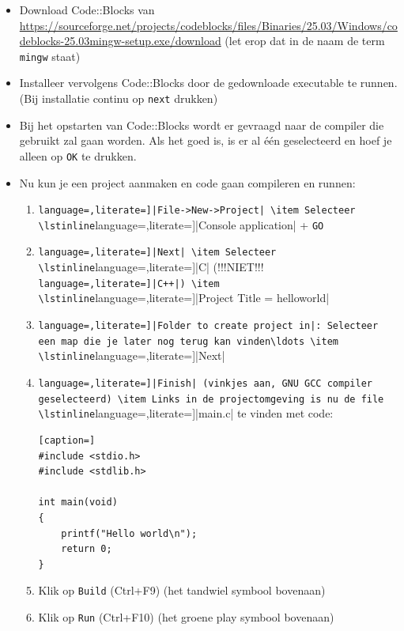\documentclass[a4paper,10pt,fleqn,twoside]{article}
\begin{document}
\begin{itemize}
\item Download Code::Blocks van \url{https://sourceforge.net/projects/codeblocks/files/Binaries/25.03/Windows/codeblocks-25.03mingw-setup.exe/download} (let erop dat in de naam de term \texttt{mingw} staat)
\item Installeer vervolgens Code::Blocks door de gedownloade executable te runnen. (Bij installatie continu op \texttt{next} drukken)
\item Bij het opstarten van Code::Blocks wordt er gevraagd naar de compiler die gebruikt zal gaan worden. Als het goed is, is er al \'e\'en geselecteerd en hoef je alleen op \texttt{OK} te drukken.
\item Nu kun je een project aanmaken en code gaan compileren en runnen:
\begin{enumerate}[label=\alph*.]
\item \lstinline[language=,literate=]|File->New->Project|
\item Selecteer \lstinline[language=,literate=]|Console application| + \lstinline|GO|
\item \lstinline[language=,literate=]|Next|
\item Selecteer \lstinline[language=,literate=]|C| (!!!NIET!!! \lstinline[language=,literate=]|C++|)
\item \lstinline[language=,literate=]|Project Title = helloworld|
\item \lstinline[language=,literate=]|Folder to create project in|: Selecteer een map die je later nog terug kan vinden\ldots
\item \lstinline[language=,literate=]|Next|
\item \lstinline[language=,literate=]|Finish| (vinkjes aan, GNU GCC compiler geselecteerd)
\item Links in de projectomgeving is nu de file \lstinline[language=,literate=]|main.c| te vinden met code:

\begin{lstlisting}[caption=]
#include <stdio.h>
#include <stdlib.h>

int main(void)
{
    printf("Hello world\n");
    return 0;
}
\end{lstlisting}
\item Klik op \lstinline|Build| (Ctrl+F9) (het tandwiel symbool bovenaan)
\item Klik op \lstinline|Run| (Ctrl+F10) (het groene play symbool bovenaan)
\end{enumerate}
\end{itemize}
\end{document}
